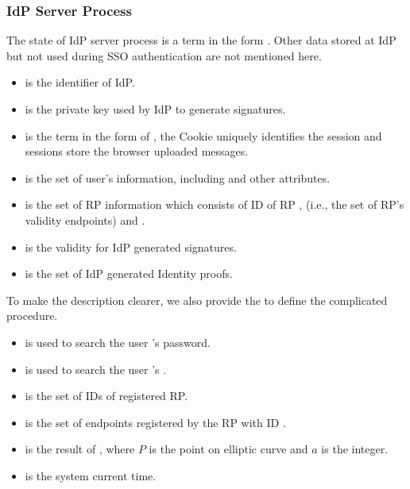 \subsubsection{IdP Server Process}
The state of IdP server process is a term in the form . Other data stored at IdP but not used during SSO authentication are not mentioned here.
\begin{itemize}
\setlength\itemsep{-2pt}
\item {} is the identifier of IdP.
\item {} is the private key used by IdP to generate signatures.
\item {} is the term in the form of , the Cookie uniquely identifies the session and sessions store the  browser uploaded messages.
\item {} is the set of user's information, including    and other attributes.
\item {} is the set of RP information which consists of ID of RP ,  (i.e., the set of RP's validity endpoints) and .
\item {} is the validity for IdP generated signatures.
\item {} is the set of IdP generated Identity proofs.
\end{itemize}
To make the description clearer, we also provide the  to define the complicated procedure.
\begin{itemize}
\setlength\itemsep{-2pt}
\item {} is used to search the user 's password.
\item {} is used to search the user 's .
\item {} is the set of IDs of registered RP.
\item {} is the set of endpoints registered by the RP with ID .
\item {} is the result of , where $P$ is the point on elliptic curve and $a$ is the integer.
\item {} is the system current time.
\end{itemize}

